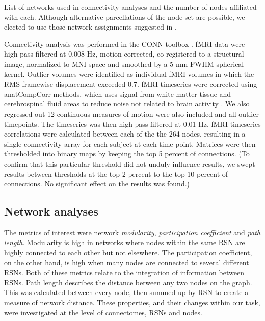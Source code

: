 \begin{table}[t]
	\renewcommand{\tabcolsep}{0.09cm}
	\centering
	
	\caption[List of networks.]{List of networks used in connectivity analyses and the number of nodes affiliated with each. Although alternative parcellations of the node set are possible, we elected to use those network assignments suggested in \citep{Power2013}.}
	\label{table:ch2-power-nodes}
\end{table}

Connectivity analysis was performed in the CONN toolbox \citep{WhitfieldGabrieli2012}. fMRI data were high-pass filtered at 0.008 Hz, motion-corrected, co-registered to a structural image, normalized to MNI space and smoothed by a 5 mm FWHM spherical kernel. Outlier volumes were identified as individual fMRI volumes in which the RMS framewise-displacement exceeded 0.7. fMRI timeseries were corrected using anatCompCorr methods, which uses signal from white matter tissue and cerebrospinal fluid areas to reduce noise not related to brain activity \citep{Chai2012}. We also regressed out 12 continuous measures of motion were also included and all outlier timepoints. The timeseries was then high-pass filtered at 0.01 Hz. fMRI timeseries correlations were calculated between each of the the 264 nodes, resulting in a single connectivity array for each subject at each time point. Matrices were then thresholded into binary maps by keeping the top 5 percent of connections. (To confirm that this particular threshold did not unduly influence results, we swept results between thresholds at the top 2 percent to the top 10 percent of connections. No significant effect on the results was found.)

\subsection{Network analyses}

The metrics of interest were network \textit{modularity}, \textit{participation coefficient} and \textit{path length}. Modularity is high in networks where nodes within the same RSN are highly connected to each other but not elsewhere. The participation coefficient, on the other hand, is high when many nodes are connected to several different RSNs. Both of these metrics relate to the integration of information between RSNs. Path length describes the distance between any two nodes on the graph. This was calculated between every node, then summed up by RSN to create a measure of network distance. These properties, and their changes within our task, were investigated at the level of connectomes, RSNs and nodes. 


